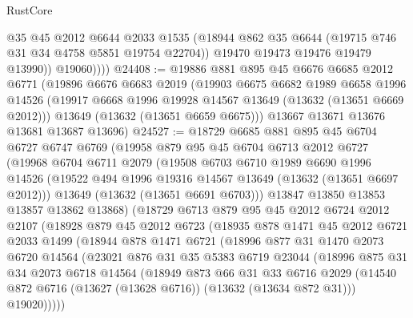 \begin{lexlean}{RustCore}
\begin{coremodule}
                @35
                @45
                @2012
                @6644
                @2033
                @1535
                (@18944 @862 @35 @6644 (@19715 @746 @31 @34 @4758 @5851 @19754 @22704))
                @19470
                @19473
                @19476
                @19479
                @13990))
            @19060))))
@24408 := @19886
    @881
    @895
    @45
    @6676
    @6685
    @2012
    @6771
    (@19896
      @6676
      @6683
      @2019
      (@19903
        @6675
        @6682
        @1989
        @6658
        @1996
        @14526
        (@19917 @6668 @1996 @19928 @14567 @13649 (@13632 (@13651 @6669 @2012)))
        @13649
        (@13632 (@13651 @6659 @6675)))
      @13667
      @13671
      @13676
      @13681
      @13687
      @13696)
@24527 := @18729
    @6685
    @881
    @895
    @45
    @6704
    @6727
    @6747
    @6769
    (@19958
      @879
      @95
      @45
      @6704
      @6713
      @2012
      @6727
      (@19968
        @6704
        @6711
        @2079
        (@19508
          @6703
          @6710
          @1989
          @6690
          @1996
          @14526
          (@19522 @494 @1996 @19316 @14567 @13649 (@13632 (@13651 @6697 @2012)))
          @13649
          (@13632 (@13651 @6691 @6703)))
        @13847
        @13850
        @13853
        @13857
        @13862
        @13868)
      (@18729
        @6713
        @879
        @95
        @45
        @2012
        @6724
        @2012
        @2107
        (@18928
          @879
          @45
          @2012
          @6723
          (@18935
            @878
            @1471
            @45
            @2012
            @6721
            @2033
            @1499
            (@18944
              @878
              @1471
              @6721
              (@18996
                @877
                @31
                @1470
                @2073
                @6720
                @14564
                (@23021
                  @876
                  @31
                  @35
                  @5383
                  @6719
                  @23044
                  (@18996
                    @875
                    @31
                    @34
                    @2073
                    @6718
                    @14564
                    (@18949
                      @873
                      @66
                      @31
                      @33
                      @6716
                      @2029
                      (@14540 @872 @6716 (@13627 (@13628 @6716)) (@13632 (@13634 @872 @31)))
                      @19020)))))

\end{coremodule}
\end{lexlean}
